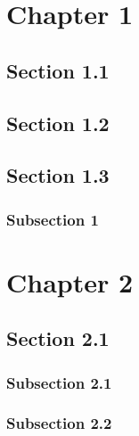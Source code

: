 \documentclass{report}
\begin{document}
\chapter {Chapter 1}

\section{Section 1.1}

\section{Section 1.2}

\section{Section 1.3}

\subsection{Subsection 1}

\chapter {Chapter 2}

\section{Section 2.1}

\subsection{Subsection 2.1}

\subsection{Subsection 2.2}


\end{document}

